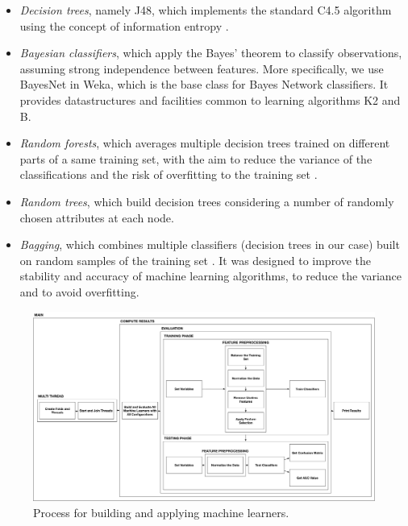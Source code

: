 \begin{itemize}
\item \textit{Decision trees}, namely J48, which implements the standard C4.5 algorithm using the concept of information entropy \citep{Quinlan1993}.
\item \textit{Bayesian classifiers}, which apply the Bayes' theorem to classify observations, assuming strong independence between features. More specifically, we use BayesNet in Weka, which is the base class for Bayes Network classifiers. It provides datastructures and facilities common to learning algorithms K2 and B.
\item \textit{Random forests}, which averages multiple decision trees trained on different parts of a same training set, with the aim to reduce the variance of the classifications and the risk of overfitting to the training set \citep{Breiman2001}.
\item \textit{Random trees}, which build decision trees considering a number of randomly chosen attributes at each node.
\item \textit{Bagging}, which combines multiple classifiers (decision trees in our case) built on random samples of the training set \citep{Breiman1996}. It was designed to improve the stability and accuracy of machine learning algorithms, to reduce the variance and to avoid overfitting.
\end{itemize}

 
\begin{landscape}
 \begin{figure}[t]
 	\centering
 	\includegraphics[width=\linewidth]{figs/MachineLearning.pdf}
 	\caption{Process for building and applying machine learners.}
 	\label{fig:MLProcess}
 	\vspace{-4mm}
 \end{figure}
\end{landscape}
 
